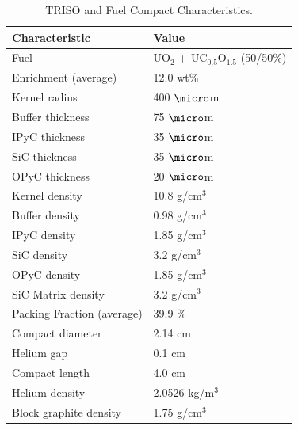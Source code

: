 \documentclass[11pt,letterpaper]{article}
\begin{document}
	\begin{table}[]
		\centering
	    \caption{TRISO and Fuel Compact Characteristics.}
	    \label{tab:compact}
		\begin{tabular}{l|l}
		\hline
		Characteristic                   & Value                \\ \hline
		Fuel                             & UO$_2$ + UC$_{0.5}$O$_{1.5}$ (50/50\%)  \\
		Enrichment (average)             & 12.0 wt\%            \\
		Kernel radius                    & 400 $\micro$m        \\
		Buffer thickness                 & 75 $\micro$m         \\
		IPyC thickness                   & 35 $\micro$m         \\
		SiC thickness                    & 35 $\micro$m         \\
		OPyC thickness                   & 20 $\micro$m         \\
    	Kernel density                   & 10.8 g/cm$^3$        \\
		Buffer density                   & 0.98 g/cm$^3$        \\
		IPyC density                     & 1.85 g/cm$^3$        \\
		SiC density                      & 3.2  g/cm$^3$        \\
		OPyC density                     & 1.85 g/cm$^3$        \\
		SiC Matrix density               & 3.2 g/cm$^3$         \\
		Packing Fraction (average)       & 39.9 \%              \\
		Compact diameter                 & 2.14 cm              \\
		Helium gap                       & 0.1 cm               \\
		Compact length                   & 4.0 cm               \\ 
        Helium density           		 & 2.0526 kg/m$^3$      \\
        Block graphite density           & 1.75 g/cm$^3$        \\ \hline

		\end{tabular}
	\end{table}
\end{document}
